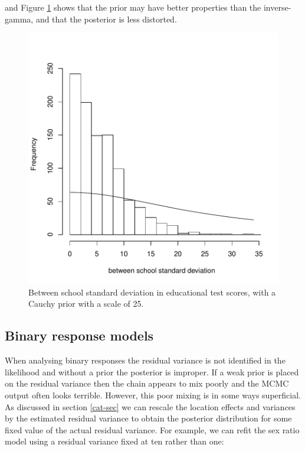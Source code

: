 \documentclass{article}
\begin{document}
\begin{Schunk}
\end{Schunk}

and Figure \ref{school3-fig} shows that the prior may have better properties than the inverse-gamma, and that the posterior is less distorted.


\begin{figure}[!h]
\begin{center}
\includegraphics{Lecture8-018}
\end{center}
\caption{Between school standard deviation in educational test scores, with a Cauchy prior with a scale of 25.}
\label{school3-fig}
\end{figure}

\subsection{Binary response models}

When analysing binary responses the residual variance is not identified in the likelihood and without a prior the posterior is improper.  If a weak prior is placed on the residual variance then the chain appears to mix poorly and the MCMC output often looks terrible. However, this poor mixing is in some ways superficial. As discussed in section \ref{cat-sec} we can rescale the location effects and variances by the estimated residual variance to obtain the posterior distribution for some fixed value of the actual residual variance. For example, we can refit the sex ratio model using a residual variance fixed at ten rather than one:
\end{document}

